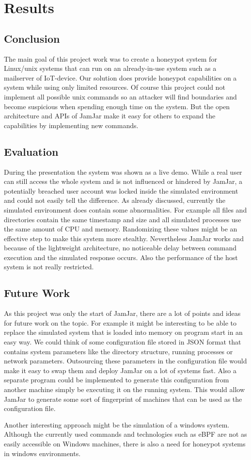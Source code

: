 \chapter{Results}
\label{chap:results}
\section{Conclusion}
The main goal of this project work was to create a honeypot system for Linux/unix systems that can run on an already-in-use system such as a mailserver of IoT-device. Our solution does provide honeypot capabilities on a system while using only limited resources. Of course this project could not implement all possible unix commands so an attacker will find boundaries and become suspicious when spending enough time on the system. But the open architecture and APIs of JamJar make it easy for others to expand the capabilities by implementing new commands.

\section{Evaluation}
During the presentation the system was shown as a live demo. While a real user can still access the whole system and is not influenced or hindered by JamJar, a potentially breached user account was locked inside the simulated environment and could not easily tell the difference.
As already discussed, currently the simulated environment does contain some abnormalities. For example all files and directories contain the same timestamp and size and all simulated processes use the same amount of CPU and memory. Randomizing these values might be an effective step to make this system more stealthy. Nevertheless JamJar works and because of the lightweight architecture, no noticeable delay between command execution and the simulated response occurs. Also the performance of the host system is not really restricted.

\section{Future Work}
As this project was only the start of JamJar, there are a lot of points and ideas for future work on the topic. For example it might be interesting to be able to replace the simulated system that is loaded into memory on program start in an easy way. We could think of some configuration file stored in JSON format that contains system parameters like the directory structure, running processes or network parameters. Outsourcing these parameters in the configuration file would make it easy to swap them and deploy JamJar on a lot of systems fast. 
Also a separate program could be implemented to generate this configuration from another machine simply be executing it on the running system. This would allow JamJar to generate some sort of fingerprint of machines that can be used as the configuration file.

Another interesting approach might be the simulation of a windows system. Although the currently used commands and technologies such as eBPF are not as easily accessible on Windows machines, there is also a need for honeypot systems in windows environments.

